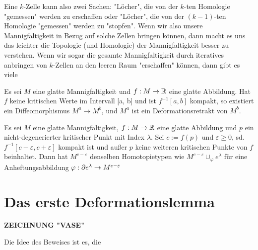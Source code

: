 \documentclass[a4paper,11pt]{article}
\begin{document}
Eine $k$-Zelle kann also zwei Sachen: "Löcher", die von der $k$-ten Homologie
"gemessen" werden zu erschaffen oder "Löcher", die von der $(k-1)$-ten Homologie
"gemessen" werden zu "stopfen". Wenn wir also unsere Mannigfaltigkeit in 
Bezug auf solche Zellen bringen können, dann macht es uns das leichter die 
Topologie (und Homologie) der Mannigfaltigkeit besser zu verstehen. Wenn wir
sogar die gesamte Mannigfaltigkeit durch iteratives anbringen von $k$-Zellen
an den leeren Raum "erschaffen" können, dann gibt es viele


\begin{theorem}
    \label{theorem:erstes deformationslemma}
    Es sei $M$ eine glatte Mannigfaltigkeit und $f: M \rightarrow {\mathbb R}$ eine
    glatte Abbildung. Hat $f$ keine kritischen Werte im Intervall [a, b] und ist
    $f^{-1}[a, b]$ kompakt, so existiert ein Diffeomorphismus 
    $M^a \rightarrow M^b$, und $M^a$ ist ein Deformationsretrakt von $M^b$.
\end{theorem}

\begin{theorem}
    \label{theorem:zweites deformationslemma}
    Es sei $M$ eine glatte Mannigfaltigkeit, $f: M \rightarrow {\mathbb R}$ eine glatte
    Abbildung und $p$ ein nicht-degenerierter kritischer Punkt mit Index 
    $\lambda$. Sei $c := f(p)$ und $\varepsilon \geq 0$, sd. 
    $f^{-1}[c - \varepsilon, c + \varepsilon]$ kompakt ist und außer $p$ keine 
    weiteren kritischen Punkte von $f$ beinhaltet. Dann hat $M^{c-\varepsilon}$
    denselben Homotopietypen wie $M^{c - \varepsilon} \cup_{\varphi} e^{\lambda}$
    für eine Anheftungsabbildung 
    $\varphi: {\partial} e^{\lambda} \rightarrow M^{c-\varepsilon}$
\end{theorem}

\section{Das erste Deformationslemma}

\textbf{ZEICHNUNG "VASE"}

Die Idee des Beweises ist es, die 
\end{document}
